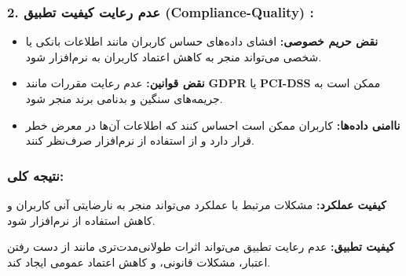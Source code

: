 \subsubsection*{2. عدم رعایت کیفیت تطبیق (Compliance-Quality) :}
\begin{itemize}
	\item \textbf{نقض حریم خصوصی:} افشای داده‌های حساس کاربران مانند اطلاعات بانکی یا شخصی می‌تواند منجر به کاهش اعتماد کاربران به نرم‌افزار شود.
	\item \textbf{نقض قوانین:} عدم رعایت مقررات مانند \textbf{GDPR} یا \textbf{PCI-DSS} ممکن است به جریمه‌های سنگین و بدنامی برند منجر شود.
	\item \textbf{ناامنی داده‌ها:} کاربران ممکن است احساس کنند که اطلاعات آن‌ها در معرض خطر قرار دارد و از استفاده از نرم‌افزار صرف‌نظر کنند.
\end{itemize}

\subsubsection*{نتیجه کلی:}

	 \textbf{کیفیت عملکرد:} مشکلات مرتبط با عملکرد می‌تواند منجر به نارضایتی آنی کاربران و کاهش استفاده از نرم‌افزار شود.
	
	\textbf{کیفیت تطبیق:} عدم رعایت تطبیق می‌تواند اثرات طولانی‌مدت‌تری مانند از دست رفتن اعتبار، مشکلات قانونی، و کاهش اعتماد عمومی ایجاد کند.



